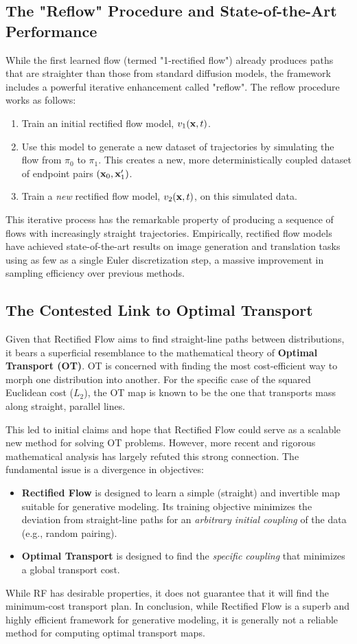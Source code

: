 \subsection{The "Reflow" Procedure and State-of-the-Art Performance}
While the first learned flow (termed "1-rectified flow") already produces paths that are straighter than those from standard diffusion models, the framework includes a powerful iterative enhancement called "reflow". The reflow procedure works as follows:
\begin{enumerate}
    \item Train an initial rectified flow model, $v_1(\mathbf{x}, t)$.
    \item Use this model to generate a new dataset of trajectories by simulating the flow from $\pi_0$ to $\pi_1$. This creates a new, more deterministically coupled dataset of endpoint pairs $(\mathbf{x}_0, \mathbf{x}_1')$.
    \item Train a \textit{new} rectified flow model, $v_2(\mathbf{x}, t)$, on this simulated data.
\end{enumerate}
This iterative process has the remarkable property of producing a sequence of flows with increasingly straight trajectories. Empirically, rectified flow models have achieved state-of-the-art results on image generation and translation tasks using as few as a single Euler discretization step, a massive improvement in sampling efficiency over previous methods.

\subsection{The Contested Link to Optimal Transport}
Given that Rectified Flow aims to find straight-line paths between distributions, it bears a superficial resemblance to the mathematical theory of \textbf{Optimal Transport (OT)}. OT is concerned with finding the most cost-efficient way to morph one distribution into another. For the specific case of the squared Euclidean cost ($L_2$), the OT map is known to be the one that transports mass along straight, parallel lines.

This led to initial claims and hope that Rectified Flow could serve as a scalable new method for solving OT problems. However, more recent and rigorous mathematical analysis has largely refuted this strong connection. The fundamental issue is a divergence in objectives:
\begin{itemize}
    \item \textbf{Rectified Flow} is designed to learn a simple (straight) and invertible map suitable for generative modeling. Its training objective minimizes the deviation from straight-line paths for an \textit{arbitrary initial coupling} of the data (e.g., random pairing).
    \item \textbf{Optimal Transport} is designed to find the \textit{specific coupling} that minimizes a global transport cost.
\end{itemize}
While RF has desirable properties, it does not guarantee that it will find the minimum-cost transport plan. In conclusion, while Rectified Flow is a superb and highly efficient framework for generative modeling, it is generally not a reliable method for computing optimal transport maps.

